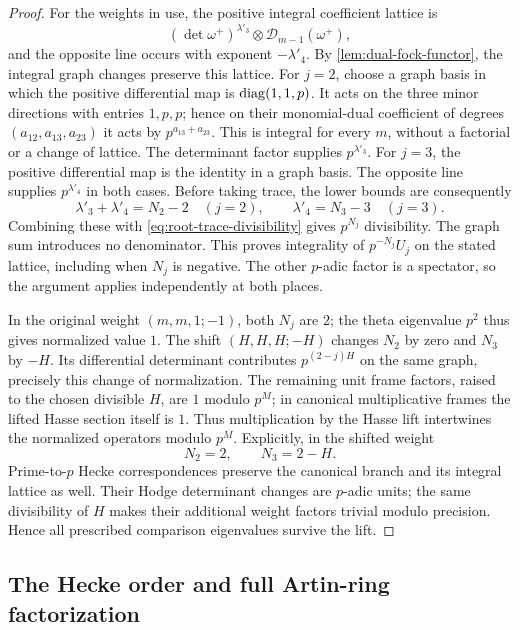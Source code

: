 \begin{proof}
For the weights in use, the positive integral coefficient lattice is
\[
 (\det\omega^+)^{\lambda'_3}
 \otimes
 \mathcal D_{m-1}(\omega^+),
\]
and the opposite line occurs with exponent $-\lambda'_4$.
By \cref{lem:dual-fock-functor}, the integral graph changes preserve
this lattice.  For $j=2$, choose a graph basis in which the positive
differential map is $\operatorname{diag}(1,1,p)$.  It acts on the three minor
directions with entries $1,p,p$; hence on their monomial-dual
coefficient of degrees $(a_{12},a_{13},a_{23})$ it acts by
$p^{a_{13}+a_{23}}$.  This is integral for every $m$, without a
factorial or a change of lattice.  The determinant factor supplies
$p^{\lambda'_3}$.  For $j=3$, the positive differential map is the
identity in a graph basis.  The opposite line supplies
$p^{\lambda'_4}$ in both cases.  Before taking trace, the lower
bounds are consequently
\[
 \lambda'_3+\lambda'_4=N_2-2
       \quad(j=2),\qquad
 \lambda'_4=N_3-3
       \quad(j=3).
\]
Combining these with \cref{eq:root-trace-divisibility} gives
$p^{N_j}$ divisibility.  The graph sum introduces no denominator.
This proves integrality of $p^{-N_j}U_j$ on the stated lattice,
including when $N_j$ is negative.  The other $p$-adic factor is a
spectator, so the argument applies independently at both places.

In the original weight $(m,m,1;-1)$, both $N_j$ are $2$; the
theta eigenvalue $p^2$ thus gives normalized value $1$.
The shift $(H,H,H;-H)$ changes $N_2$ by zero and $N_3$ by $-H$.
Its differential determinant contributes $p^{(2-j)H}$ on the
same graph, precisely this change of normalization.  The remaining
unit frame factors, raised to the chosen divisible $H$, are $1$
modulo $p^M$; in canonical multiplicative frames the lifted Hasse
section itself is $1$.  Thus multiplication by the Hasse lift
intertwines the normalized operators modulo $p^M$.  Explicitly,
in the shifted weight
\[
                         N_2=2,\qquad N_3=2-H.
\]
Prime-to-$p$ Hecke correspondences preserve the canonical branch
and its integral lattice as well.  Their Hodge determinant changes
are $p$-adic units; the same divisibility of $H$ makes their
additional weight factors trivial modulo precision.  Hence all
prescribed comparison eigenvalues survive the lift.
\end{proof}

\subsection{The Hecke order and full Artin-ring factorization}

